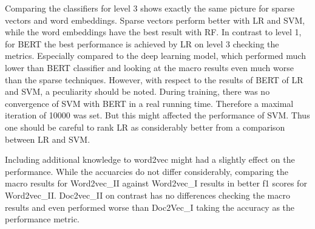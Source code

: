 \documentclass[12pt, a4paper, titlepage]{article}
\begin{document}
Comparing the classifiers for level 3 shows exactly the same picture for sparse vectors and word embeddings. Sparse vectors perform better with \ac{LR} and \ac{SVM}, while the word embeddings have the best result with \ac{RF}. In contrast to level 1, for \ac{BERT} the best performance is achieved by \ac{LR} on level 3 checking the metrics. Especially compared to the deep learning model, which performed much lower than \ac{BERT} classifier and looking at the macro results even much worse than the sparse techniques. However, with respect to the results of BERT of LR and SVM, a peculiarity should be noted. During training, there was no convergence of \ac{SVM} with \ac{BERT} in a real running time. Therefore a maximal iteration of 10000 was set. But this might affected the performance of \ac{SVM}. Thus one should be careful to rank \ac{LR} as considerably better from a comparison between \ac{LR} and \ac{SVM}. 

Including additional knowledge to word2vec might had a slightly effect on the performance. While the accuarcies do not differ considerably, comparing the macro results for Word2vec\_II against Word2vec\_I results in better f1 scores for Word2vec\_II. Doc2vec\_II on contrast has no differences checking the macro results and even performed worse than Doc2Vec\_I taking the accuracy as the performance metric. 




\end{document}
